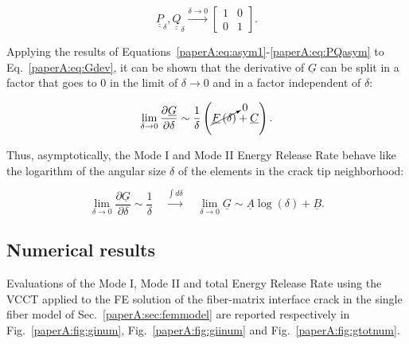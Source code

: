 \begin{equation}\label{paperA:eq:PQasym}
\underline{\underline{P}}_{\delta},\underline{\underline{Q}}_{\delta}\xrightarrow{\delta\rightarrow 0}\begin{bmatrix}1&0\\0&1\end{bmatrix}.
\end{equation}

Applying the results of Equations~\ref{paperA:eq:asym1}-\ref{paperA:eq:PQasym} to Eq.~\ref{paperA:eq:Gdev}, it can be shown that the derivative of $\underline{G}$ can be split in a factor that goes to $0$ in the limit of $\delta\rightarrow 0$ and in a factor independent of $\delta$:

\begin{equation}
\lim_{\delta\rightarrow 0}\frac{\partial \underline{G}}{\partial \delta}\sim\frac{1}{\delta}\left(\cancelto{0}{\underline{F}\left(\delta\right)}+\underline{C}\right).
\end{equation}

Thus, asymptotically, the Mode I and Mode II Energy Release Rate behave like the logarithm of the angular size $\delta$ of the elements in the crack tip neighborhood:

\begin{equation}
\lim_{\delta\rightarrow 0}\frac{\partial \underline{G}}{\partial \delta}\sim\frac{1}{\delta}\quad\xrightarrow{\int d\delta}\quad\lim_{\delta\rightarrow 0}\underline{G}\sim \underline{A}\log(\delta)+\underline{B}.
\end{equation}

\subsection{Numerical results}

Evaluations of the Mode I, Mode II and total Energy Release Rate using the VCCT applied to the FE solution of the fiber-matrix interface crack in the single fiber model of Sec.~\ref{paperA:sec:femmodel} are reported respectively in Fig.~\ref{paperA:fig:ginum}, Fig.~\ref{paperA:fig:giinum} and Fig.~\ref{paperA:fig:gtotnum}.


